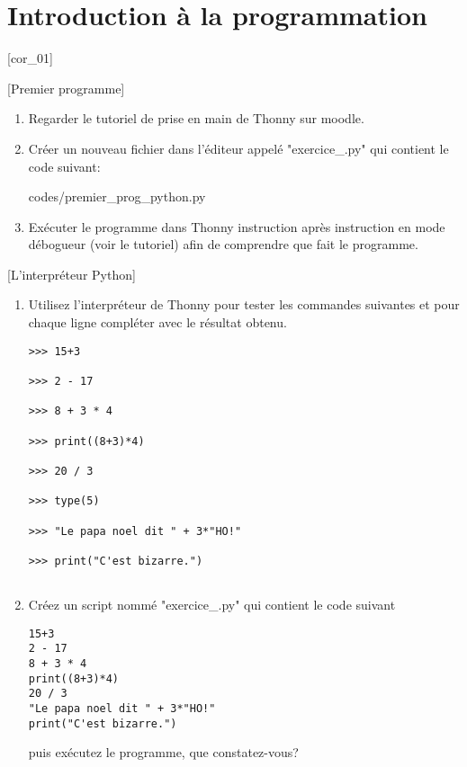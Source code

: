 \documentclass[a4paper,12pt]{article}
\newcommand{\numero}{5}                                    %
\begin{document}

\setcounter{section}{\numero}

\section{Introduction à la programmation}				
[cor_01]

\exo{}[Premier programme]  ~\\ 
\begin{enumerate}
	\item Regarder le tutoriel de prise en main de Thonny sur moodle.
	\item Créer un nouveau fichier dans l'éditeur appelé "exercice\_\getexocompteur.py" qui contient le code suivant:
	
	{codes/premier_prog_python.py}
	\item Exécuter le programme dans Thonny instruction après instruction en mode débogueur (voir le tutoriel) afin de comprendre que fait le programme.
\end{enumerate}
\finexo



\exo{}[L'interpréteur Python]  ~\\ 
\begin{enumerate}
	\item Utilisez l'interpréteur de Thonny pour tester les commandes suivantes et pour chaque ligne compléter avec le résultat obtenu.
	\begin{lstlisting}[numbers=none]
>>> 15+3
		
>>> 2 - 17 
		
>>> 8 + 3 * 4 
		
>>> print((8+3)*4)
		
>>> 20 / 3
		
>>> type(5)
		
>>> "Le papa noel dit " + 3*"HO!"
		
>>> print("C'est bizarre.")
		
	\end{lstlisting}
	\item Créez un script nommé  "exercice\_\getexocompteur.py" qui contient le code suivant
	\begin{lstlisting}[numbers=none]
15+3
2 - 17 
8 + 3 * 4 
print((8+3)*4)
20 / 3
"Le papa noel dit " + 3*"HO!"
print("C'est bizarre.")	
	\end{lstlisting}
	puis exécutez le programme, que constatez-vous?
	
\end{enumerate}
\finexo
\end{document}
